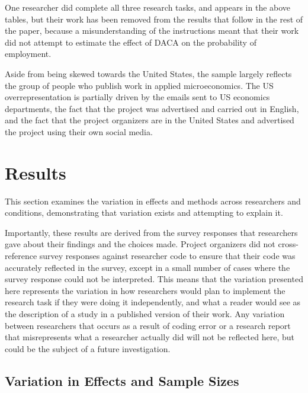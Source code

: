 \documentclass[
  letterpaper,
  DIV=11,
  numbers=noendperiod]{scrartcl}
\begin{document}
One researcher did complete all three research tasks, and appears in the
above tables, but their work has been removed from the results that
follow in the rest of the paper, because a misunderstanding of the
instructions meant that their work did not attempt to estimate the
effect of DACA on the probability of employment.

Aside from being skewed towards the United States, the sample largely
reflects the group of people who publish work in applied microeconomics.
The US overrepresentation is partially driven by the emails sent to US
economics departments, the fact that the project was advertised and
carried out in English, and the fact that the project organizers are in
the United States and advertised the project using their own social
media.

\section{Results}\label{results}

This section examines the variation in effects and methods across
researchers and conditions, demonstrating that variation exists and
attempting to explain it.

Importantly, these results are derived from the survey responses that
researchers gave about their findings and the choices made. Project
organizers did not cross-reference survey responses against researcher
code to ensure that their code was accurately reflected in the survey,
except in a small number of cases where the survey response could not be
interpreted. This means that the variation presented here represents the
variation in how researchers would plan to implement the research task
if they were doing it independently, and what a reader would see as the
description of a study in a published version of their work. Any
variation between researchers that occurs as a result of coding error or
a research report that misrepresents what a researcher actually did will
not be reflected here, but could be the subject of a future
investigation.

\subsection{Variation in Effects and Sample Sizes}\label{sec-variation}
\end{document}
